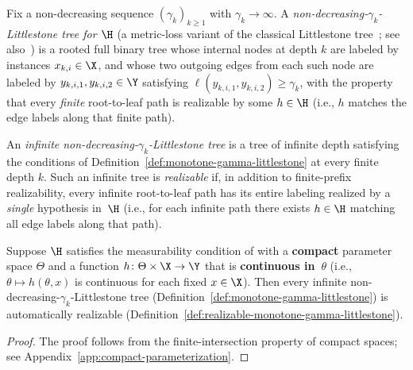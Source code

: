 \begin{definition}\label{def:monotone-gamma-littlestone}
Fix a non-decreasing sequence $(\gamma_k)_{k\ge1}$ with $\gamma_k\to\infty$.
A \emph{non-decreasing-$\gamma_k$-Littlestone tree for $\H$}
(a metric-loss variant of the classical Littlestone
tree~\citep{littlestone_learning_1988}; see
also~\citet[Definition~1.7]{bousquet_theory_2021})
is a rooted full
binary tree whose internal nodes at depth $k$ are labeled by instances
$x_{k,i}\in\X$, and whose two outgoing edges from each such node are labeled by
$y_{k,i,1},y_{k,i,2}\in\Y$ satisfying $\ell(y_{k,i,1},y_{k,i,2})\ge\gamma_k$,
with the property that every \emph{finite} root-to-leaf path is realizable by
some $h\in\H$ (i.e., $h$ matches the edge labels along that finite path).
\end{definition}

\begin{definition}\label{def:realizable-monotone-gamma-littlestone}
An \emph{infinite non-decreasing-$\gamma_k$-Littlestone tree} is
a tree of infinite depth satisfying the conditions of
Definition~\ref{def:monotone-gamma-littlestone} at every finite depth $k$.
Such an infinite tree is \emph{realizable} if,
in addition to finite-prefix realizability, every infinite root-to-leaf path
has its entire labeling realized by a \emph{single} hypothesis in~$\H$ (i.e., for
each infinite path there exists $h\in\H$ matching all edge labels along that
path).
\end{definition}

\begin{lemma}\label{lem:bridging}
Suppose $\H$ satisfies the measurability condition of
\citet[Definition~3.3]{bousquet_theory_2021} with a \textbf{compact} parameter space
$\Theta$ and a function $h\colon\Theta\times\X\to\Y$ that is \textbf{continuous in~$\theta$} (i.e., $\theta\mapsto h(\theta,x)$ is continuous for each fixed $x\in\X$).
Then every infinite non-decreasing-$\gamma_k$-Littlestone tree
(Definition~\ref{def:monotone-gamma-littlestone}) is automatically realizable
(Definition~\ref{def:realizable-monotone-gamma-littlestone}).
\end{lemma}
\begin{proof}
The proof follows from the finite-intersection property
of compact spaces; see Appendix~\ref{app:compact-parameterization}.
\end{proof}

